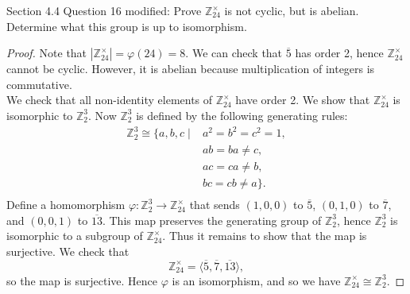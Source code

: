 Section 4.4 Question 16 modified: Prove $\mathbb{Z}_{24}^\times$ is not
cyclic, but is abelian. Determine what this group is up to isomorphism.

\begin{proof}
  Note that $|\mathbb{Z}_{24}^\times|=\varphi(24)=8$. We can check that
  $\overline{5}$ has order 2, hence $\mathbb{Z}_{24}^\times$ cannot be
  cyclic. However, it is abelian because multiplication of integers is
  commutative. \\

  We check that all non-identity elements of $\mathbb{Z}_{24}^\times$ have
  order 2. We show that $\mathbb{Z}_{24}^\times$ is isomorphic to
  $\mathbb{Z}_2^3$. Now $\mathbb{Z}_2^3$ is defined by the following
  generating rules:
  \begin{align*}
    \mathbb{Z}_2^3\cong \{a,b,c\;|\;
                        &a^2=b^2=c^2=1, \\
                        &ab=ba\neq c, \\
                        &ac=ca\neq b, \\
                        &bc=cb\neq a\}. \\
  \end{align*}
  Define a homomorphism
  $\varphi:\mathbb{Z}_2^3\rightarrow\mathbb{Z}_{24}^\times$ that sends
  $(1,0,0)$ to $\overline{5}$, $(0,1,0)$ to $\overline{7}$, and $(0,0,1)$
  to $\overline{13}$. This map preserves the generating group of
  $\mathbb{Z}_2^3$, hence $\mathbb{Z}_2^3$ is isomorphic to a subgroup of
  $\mathbb{Z}_{24}^\times$. Thus it remains to show that the map is
  surjective. We check that
  \begin{equation*}
    \mathbb{Z}_{24}^\times =
    \langle\overline{5},\overline{7},\overline{13}\rangle,
  \end{equation*}
  so the map is surjective. Hence $\varphi$ is an isomorphism, and so we have
  $\mathbb{Z}_{24}^\times\cong\mathbb{Z}_2^3$.
\end{proof}
